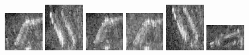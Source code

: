 \begin{figure}
    \includegraphics[width=0.15\textwidth]{chapters/images/dataset/all-class-images/bottle/bottle-2.jpg}
    \includegraphics[width=0.15\textwidth]{chapters/images/dataset/all-class-images/bottle/bottle-296.jpg}
    \includegraphics[width=0.15\textwidth]{chapters/images/dataset/all-class-images/bottle/bottle-4.jpg}
    \includegraphics[width=0.15\textwidth]{chapters/images/dataset/all-class-images/bottle/bottle-14.jpg}
    \includegraphics[width=0.15\textwidth]{chapters/images/dataset/all-class-images/bottle/bottle-231.jpg}
    \includegraphics[width=0.15\textwidth]{chapters/images/dataset/all-class-images/bottle/bottle-93.jpg}
    

\end{figure}
